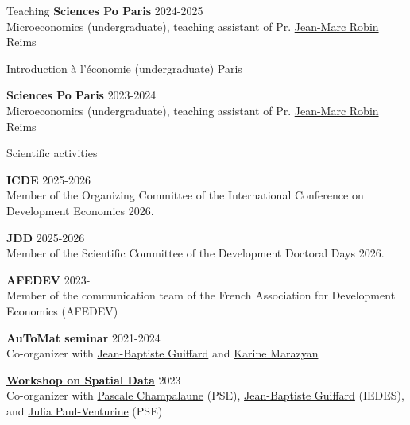 \documentclass[
]{resume}
\begin{document}
\begin{small}
\begin{rSection}{Teaching}
\textbf{Sciences Po Paris} \hfill {2024-2025} \\
Microeconomics (undergraduate), teaching assistant of Pr. \href{https://scholar.google.com/citations?user=tt48sngAAAAJ&hl=fr}{Jean-Marc Robin} \hfill {Reims}  \\
\vspace{-0.2cm}

Introduction à l'économie (undergraduate) \hfill {Paris} \\
\vspace{-0.2cm}

\textbf{Sciences Po Paris} \hfill {2023-2024} \\
Microeconomics (undergraduate), teaching assistant of Pr. \href{https://scholar.google.com/citations?user=tt48sngAAAAJ&hl=fr}{Jean-Marc Robin} \hfill {Reims}  \\

\end{rSection}

\begin{rSection}{Scientific activities}

\textbf{ICDE} \hfill {2025-2026}\\
Member of the Organizing Committee of the International Conference on Development Economics 2026.

\textbf{JDD} \hfill {2025-2026}\\
Member of the Scientific Committee of the Development Doctoral Days 2026.

\textbf{AFEDEV} \hfill {2023-}\\
Member of the communication team of the French Association for Development Economics (AFEDEV)

\textbf{AuToMat seminar} \hfill {2021-2024}\\
Co-organizer with \href{https://scholar.google.com/citations?user=BnfXmC4AAAAJ&hl=fr}{Jean-Baptiste Guiffard} and \href{https://scholar.google.com/citations?user=mImSYc4AAAAJ\&hl=fr\&oi=ao}{Karine Marazyan}
\vspace{0.125cm}

\href{https://www.parisschoolofeconomics.eu/en/events/workshop-on-spatial-data-new-sources-new-perspectives-1-december/ } {\textbf{Workshop on Spatial Data}} \hfill {2023} \\
Co-organizer with \href{https://pchampalaune.github.io/}{Pascale Champalaune} (PSE), \href{https://scholar.google.com/citations?user=BnfXmC4AAAAJ&hl=fr}{Jean-Baptiste Guiffard} (IEDES), and \href{https://julia-paulventurine.github.io/Julia}{Julia Paul-Venturine} (PSE)


\end{rSection}
\end{small}
\end{document}
